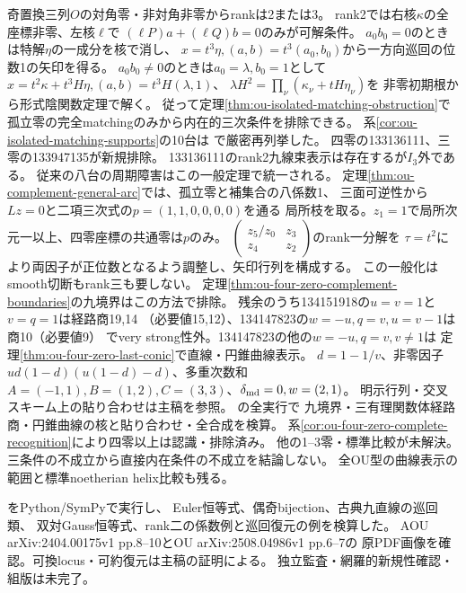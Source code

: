 \documentclass[11pt,a4paper]{ltjsarticle}
\begin{document}
奇置換三列$O$の対角零・非対角非零からrankは2または3。
rank2では右核$\kappa$の全座標非零、左核$\ell$で
$(\ell P)a+(\ell Q)b=0$のみが可解条件。
$a_0b_0=0$のときは特解$\eta$の一成分を核で消し、
$x=t^3\eta,(a,b)=t^3(a_0,b_0)$から一方向巡回の位数1の矢印を得る。
$a_0b_0\ne0$のときは$a_0=\lambda,b_0=1$として
$x=t^2\kappa+t^3H\eta,(a,b)=t^3H(\lambda,1)$、
$\lambda H^2=\prod_\nu(\kappa_\nu+tH\eta_\nu)$を
非零初期根から形式陰関数定理で解く。
従って定理\ref{thm:ou-isolated-matching-obstruction}で
孤立零の完全matchingのみから内在的三次条件を排除できる。
系\ref{cor:ou-isolated-matching-supports}の10台は
で厳密再列挙した。
四零の133136111、三零の133947135が新規排除。
133136111のrank2九線束表示は存在するが$I_3$外である。
従来の八台の周期障害はこの一般定理で統一される。
定理\ref{thm:ou-complement-general-arc}では、孤立零と補集合の八係数1、
三面可逆性から$Lz=0$と二項三次式の$p=(1,1,0,0,0,0)$を通る
局所枝を取る。$z_1=1$で局所次元一以上、四零座標の共通零は$p$のみ。
$\begin{pmatrix}z_5/z_0&z_3\\z_4&z_2\end{pmatrix}$のrank一分解を
$\tau=t^2$により両因子が正位数となるよう調整し、矢印行列を構成する。
この一般化はsmooth切断もrank三も要しない。
定理\ref{thm:ou-four-zero-complement-boundaries}の九境界はこの方法で排除。
残余のうち134151918の$u=v=1$と$v=q=1$は経路商19,14
（必要値15,12）、134147823の$w=-u,q=v,u=v-1$は商10（必要値9）
でvery strong性外。134147823の他の$w=-u,q=v,v\ne1$は
定理\ref{thm:ou-four-zero-last-conic}で直線・円錐曲線表示。
$d=1-1/v$、非零因子$ud(1-d)(u(1-d)-d)$、多重次数和
$A=(-1,1),B=(1,2),C=(3,3)$、$\delta_{\rm md}=0,w=(2,1)$。
明示行列・交叉スキーム上の貼り合わせは主稿を参照。
の全実行で
九境界・三有理関数体経路商・円錐曲線の核と貼り合わせ・全合成を検算。
系\ref{cor:ou-four-zero-complete-recognition}により四零以上は認識・排除済み。
他の1--3零・標準比較が未解決。
三条件の不成立から直接内在条件の不成立を結論しない。
全OU型の曲線表示の範囲と標準noetherian helix比較も残る。

をPython/SymPyで実行し、
Euler恒等式、偶奇bijection、古典九直線の巡回類、
双対Gauss恒等式、rank二の係数例と巡回復元の例を検算した。
AOU arXiv:2404.00175v1 pp.8--10とOU arXiv:2508.04986v1 pp.6--7の
原PDF画像を確認。可換locus・可約復元は主稿の証明による。
独立監査・網羅的新規性確認・組版は未完了。
\end{document}
